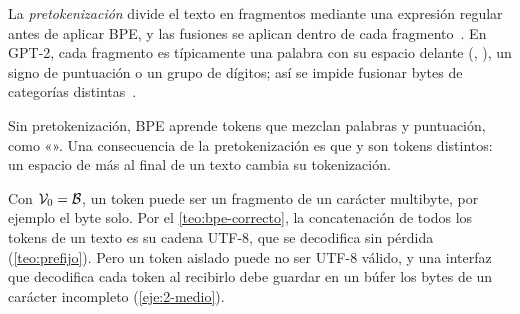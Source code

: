\begin{definicion}[Pretokenización]
La \emph{pretokenización} divide el texto en fragmentos mediante una expresión regular antes de aplicar BPE, y las fusiones se aplican dentro de cada fragmento~\cite[§2.6.9]{jm3}. En GPT-2, cada fragmento es típicamente una palabra con su espacio delante (, ), un signo de puntuación o un grupo de dígitos; así se impide fusionar bytes de categorías distintas~\cite[§2.2]{gpt2}.
\end{definicion}

Sin pretokenización, BPE aprende tokens que mezclan palabras y puntuación, como «». Una consecuencia de la pretokenización es que  y  son tokens distintos: un espacio de más al final de un texto cambia su tokenización.

\begin{observacion}
Con $\mathcal{V}_0=\mathcal{B}$, un token puede ser un fragmento de un carácter multibyte, por ejemplo el byte  solo. Por el \cref{teo:bpe-correcto}, la concatenación de todos los tokens de un texto es su cadena UTF-8, que se decodifica sin pérdida (\cref{teo:prefijo}). Pero un token aislado puede no ser UTF-8 válido, y una interfaz que decodifica cada token al recibirlo debe guardar en un búfer los bytes de un carácter incompleto (\cref{eje:2-medio}).
\end{observacion}

